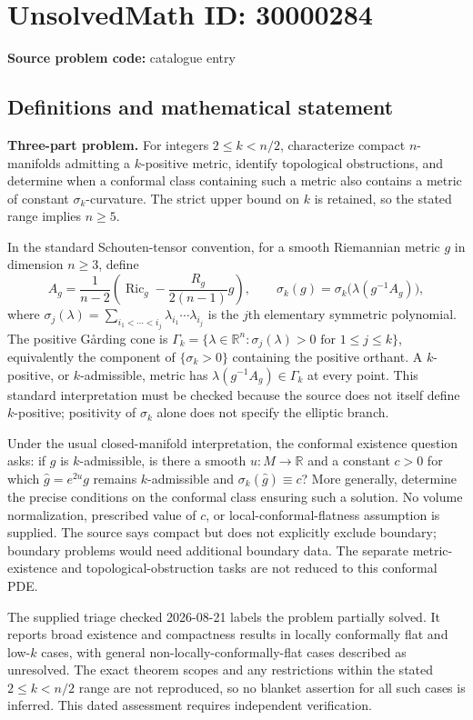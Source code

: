 \documentclass[11pt]{article}
\newcommand{\R}{\mathbb{R}}
\begin{document}
\section*{UnsolvedMath ID: 30000284}
\textbf{Source problem code:} catalogue entry
\subsection{Definitions and mathematical statement}
\textbf{Three-part problem.} For integers \(2\le k<n/2\), characterize compact \(n\)-manifolds admitting a \(k\)-positive metric, identify topological obstructions, and determine when a conformal class containing such a metric also contains a metric of constant \(\sigma_k\)-curvature. The strict upper bound on \(k\) is retained, so the stated range implies \(n\ge5\).\par In the standard Schouten-tensor convention, for a smooth Riemannian metric \(g\) in dimension \(n\ge3\), define\[A_g=\frac1{n-2}\left(\operatorname{Ric}_g-\frac{R_g}{2(n-1)}g\right),\qquad \sigma_k(g)=\sigma_k\bigl(\lambda(g^{-1}A_g)\bigr),\] where \(\sigma_j(\lambda)=\sum_{i_1<\cdots<i_j}\lambda_{i_1}\cdots\lambda_{i_j}\) is the \(j\)th elementary symmetric polynomial. The positive G\aa rding cone is \(\Gamma_k=\{\lambda\in\R^n:\sigma_j(\lambda)>0\text{ for }1\le j\le k\}\), equivalently the component of \(\{\sigma_k>0\}\) containing the positive orthant. A \(k\)-positive, or \(k\)-admissible, metric has \(\lambda(g^{-1}A_g)\in\Gamma_k\) at every point. This standard interpretation must be checked because the source does not itself define \(k\)-positive; positivity of \(\sigma_k\) alone does not specify the elliptic branch.\par Under the usual closed-manifold interpretation, the conformal existence question asks: if \(g\) is \(k\)-admissible, is there a smooth \(u:M\to\R\) and a constant \(c>0\) for which \(\widehat g=e^{2u}g\) remains \(k\)-admissible and \(\sigma_k(\widehat g)\equiv c\)? More generally, determine the precise conditions on the conformal class ensuring such a solution. No volume normalization, prescribed value of \(c\), or local-conformal-flatness assumption is supplied. The source says compact but does not explicitly exclude boundary; boundary problems would need additional boundary data. The separate metric-existence and topological-obstruction tasks are not reduced to this conformal PDE.\par The supplied triage checked 2026-08-21 labels the problem partially solved. It reports broad existence and compactness results in locally conformally flat and low-\(k\) cases, with general non-locally-conformally-flat cases described as unresolved. The exact theorem scopes and any restrictions within the stated \(2\le k<n/2\) range are not reproduced, so no blanket assertion for all such cases is inferred. This dated assessment requires independent verification.
\end{document}
